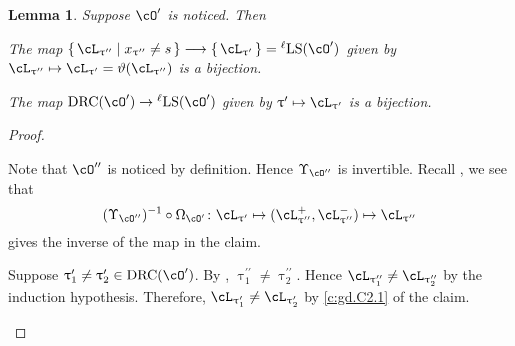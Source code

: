 \documentclass[12pt,a4paper]{amsart}
\numberwithin{equation}{section}
\newtheorem{lem}[thm]{Lemma}
\theoremstyle{remark}
\def\drc{\mathrm{DRC}}
\def\LLS{\mathrm{{}^{\ell} LS}}
\def\cOp{\cO^{\prime}}
\def\cOpp{\cO^{\prime\prime}}
\def\pcL{\cL^+}
\def\ncL{\cL^-}
\def\uptaup{\uptau^{\prime}}
\def\uptaupp{\uptau^{\prime\prime}}
\begin{document}
\begin{lem}\label{c:gd.C2}
  Suppose $\cOp$ is noticed. Then
  \begin{enumT}
    \item \label{c:gd.C2.1}The map
$\set{\cL_{\uptaupp}| x_{\uptaupp}\neq s}\longrightarrow \set{\cL_{\uptaup}}=\LLS(\cOp)$ given by
$\cL_{\uptaupp}\mapsto \cL_{\uptaup}=\vartheta(\cL_{\uptaupp})$ is a bijection.
\item
The map $\drc(\cOp)\rightarrow \LLS(\cOp)$ given by $\uptaup\mapsto \cL_{\uptaup}$ is a bijection.
\end{enumT}
\end{lem}
\begin{proof} %
  \begin{enumPF}
    \item
  Note that $\cOpp$ is noticed by definition. Hence $\Upsilon_{\cOpp}$ is invertible.
  Recall , we see that
  \[
    (\Upsilon_{\cOpp})^{-1}\circ \Omega_{\cOp}\colon
    \cL_{\uptaup}\mapsto (\pcL_{\uptaupp},\ncL_{\uptaupp})\mapsto \cL_{\uptaupp}
  \]
  gives the inverse of the map in the claim.
  \item
  Suppose $\uptaup_{1}\neq \uptaup_{2}\in \drc(\cOp)$. By ,
  $\uptaupp_{1}\neq \uptaupp_{2}$. Hence
  $\cL_{\uptaupp_{1}}\neq\cL_{\uptaupp_{2}}$ by the induction hypothesis.
  Therefore, $\cL_{\uptaup_{1}}\neq \cL_{\uptaup_{2}}$ by \ref{c:gd.C2.1}
  of the claim.
\end{enumPF}
\end{proof}
\end{document}
